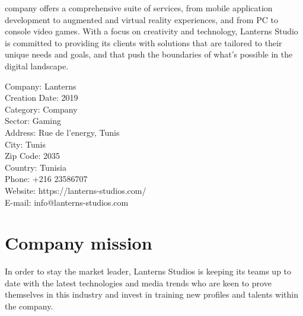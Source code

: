 \documentclass[12pt]{book}
\begin{document}
company offers a comprehensive suite of services, from mobile application development to
augmented and virtual reality experiences, and from PC to console video games. With a focus
on creativity and technology, Lanterns Studio is committed to providing its clients with
solutions that are tailored to their unique needs and goals, and that push the boundaries of what's possible in the digital landscape.
\begin{center}
    \begin{varwidth}{\textwidth}
        Company:        Lanterns\\
        Creation Date:  2019\\
        Category:       Company\\
        Sector:         Gaming\\
        Address:        Rue de l'energy, Tunis\\
        City:           Tunis\\
        Zip Code:       2035\\
        Country:        Tunisia\\
        Phone:          +216 23586707\\
        Website:        https://lanterns-studios.com/\\
        E-mail:         info@lanterns-studios.com\\
    \end{varwidth}
\end{center}

\section{Company mission}
In order to stay the market leader, Lanterns Studios is keeping its teams up to date with the
latest technologies and media trends who are keen to prove themselves in this industry and
invest in training new profiles and talents within the company.
\end{document}
